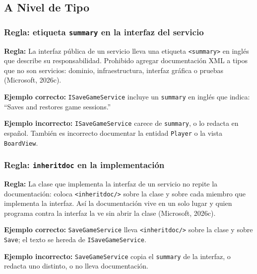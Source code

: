 \subsection{A Nivel de Tipo}

\subsubsection{Regla: etiqueta \texttt{summary} en la interfaz del servicio}

\textbf{Regla:} La interfaz pública de un servicio lleva una etiqueta \texttt{<summary>} en inglés que describe su responsabilidad. Prohibido agregar documentación XML a tipos que no son servicios: dominio, infraestructura, interfaz gráfica o pruebas (Microsoft, 2026c).

\textbf{Ejemplo correcto:} \texttt{ISaveGameService} incluye un \texttt{summary} en inglés que indica: ``Saves and restores game sessions.''

\textbf{Ejemplo incorrecto:} \texttt{ISaveGameService} carece de \texttt{summary}, o lo redacta en español. También es incorrecto documentar la entidad \texttt{Player} o la vista \texttt{BoardView}.

\subsubsection{Regla: \texttt{inheritdoc} en la implementación}

\textbf{Regla:} La clase que implementa la interfaz de un servicio no repite la documentación: coloca \texttt{<inheritdoc/>} sobre la clase y sobre cada miembro que implementa la interfaz. Así la documentación vive en un solo lugar y quien programa contra la interfaz la ve sin abrir la clase (Microsoft, 2026c).

\textbf{Ejemplo correcto:} \texttt{SaveGameService} lleva \texttt{<inheritdoc/>} sobre la clase y sobre \texttt{Save}; el texto se hereda de \texttt{ISaveGameService}.

\textbf{Ejemplo incorrecto:} \texttt{SaveGameService} copia el \texttt{summary} de la interfaz, o redacta uno distinto, o no lleva documentación.
